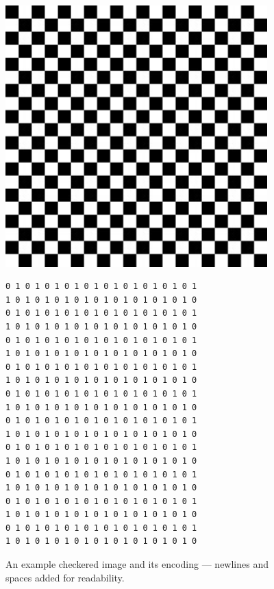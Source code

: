 \begin{figure}
	\centering
        \hspace{0.5cm}
	\begin{minipage}{0.45\textwidth}
		\includegraphics[width=0.90\textwidth]{images/checkered_image.jpg}
	\end{minipage}
        \begin{minipage}{0.45\textwidth}
		\scriptsize
\begin{verbatim}
0 1 0 1 0 1 0 1 0 1 0 1 0 1 0 1 0 1 0 1
1 0 1 0 1 0 1 0 1 0 1 0 1 0 1 0 1 0 1 0
0 1 0 1 0 1 0 1 0 1 0 1 0 1 0 1 0 1 0 1
1 0 1 0 1 0 1 0 1 0 1 0 1 0 1 0 1 0 1 0
0 1 0 1 0 1 0 1 0 1 0 1 0 1 0 1 0 1 0 1
1 0 1 0 1 0 1 0 1 0 1 0 1 0 1 0 1 0 1 0
0 1 0 1 0 1 0 1 0 1 0 1 0 1 0 1 0 1 0 1
1 0 1 0 1 0 1 0 1 0 1 0 1 0 1 0 1 0 1 0
0 1 0 1 0 1 0 1 0 1 0 1 0 1 0 1 0 1 0 1
1 0 1 0 1 0 1 0 1 0 1 0 1 0 1 0 1 0 1 0
0 1 0 1 0 1 0 1 0 1 0 1 0 1 0 1 0 1 0 1
1 0 1 0 1 0 1 0 1 0 1 0 1 0 1 0 1 0 1 0
0 1 0 1 0 1 0 1 0 1 0 1 0 1 0 1 0 1 0 1
1 0 1 0 1 0 1 0 1 0 1 0 1 0 1 0 1 0 1 0
0 1 0 1 0 1 0 1 0 1 0 1 0 1 0 1 0 1 0 1
1 0 1 0 1 0 1 0 1 0 1 0 1 0 1 0 1 0 1 0
0 1 0 1 0 1 0 1 0 1 0 1 0 1 0 1 0 1 0 1
1 0 1 0 1 0 1 0 1 0 1 0 1 0 1 0 1 0 1 0
0 1 0 1 0 1 0 1 0 1 0 1 0 1 0 1 0 1 0 1
1 0 1 0 1 0 1 0 1 0 1 0 1 0 1 0 1 0 1 0
\end{verbatim}
        \end{minipage}
	\caption{An example checkered image and its encoding --- newlines and spaces added for readability.}
	\label{fig:hardware:monitor_image}
\end{figure}

